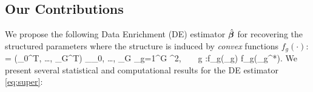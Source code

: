 \subsection{Our Contributions}
We propose the following Data Enrichment (DE) estimator $\hat{\boldsymbol{\beta}}$ for recovering the structured parameters where the structure is induced by \emph{convex} functions $f_g(\cdot)$:
{\small\beq
	\label{eq:super}
	\hbbe = (\hbbe_0^T, \dots, \hbbe_G^T) \in \argmin_{\bbeta _0, \dots, \bbeta _G}  \sum_{g=1}^{G} ^2,
	~ ~ \forall g \in [G_+]:f_g(\bbeta _g) \leq f_g(\bbeta _g^*).
\eeq}
We present several statistical and computational results for the DE estimator \cref{eq:super}:%
